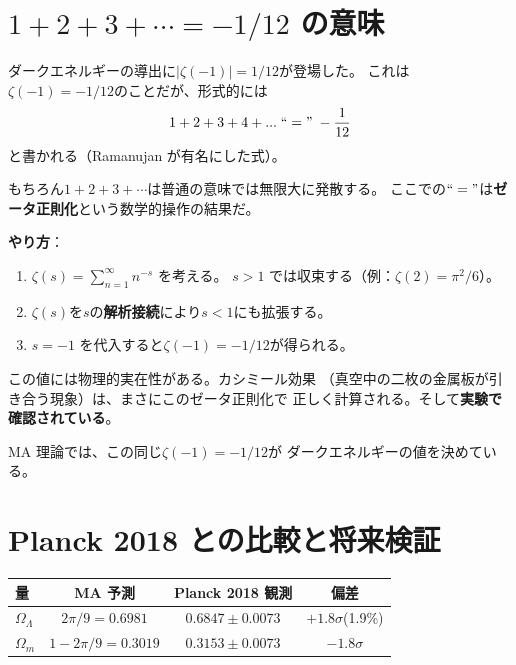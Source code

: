 \section{$1+2+3+\cdots = -1/12$ の意味}
\label{sec:zeta-regularization}

\begin{hsbox}
ダークエネルギーの導出に$|\zeta(-1)| = 1/12$が登場した。
これは$\zeta(-1) = -1/12$のことだが、形式的には
\[
1 + 2 + 3 + 4 + \cdots \;``="\; -\frac{1}{12}
\]
と書かれる（Ramanujan が有名にした式）。

もちろん$1+2+3+\cdots$は普通の意味では無限大に発散する。
ここでの$``="$は\textbf{ゼータ正則化}という数学的操作の結果だ。

\medskip
\textbf{やり方}：
\begin{enumerate}[nosep]
\item $\zeta(s) = \sum_{n=1}^{\infty} n^{-s}$ を考える。
  $s > 1$ では収束する（例：$\zeta(2) = \pi^2/6$）。
\item $\zeta(s)$を$s$の\textbf{解析接続}により$s < 1$にも拡張する。
\item $s = -1$ を代入すると$\zeta(-1) = -1/12$が得られる。
\end{enumerate}
この値には物理的実在性がある。カシミール効果
（真空中の二枚の金属板が引き合う現象）は、まさにこのゼータ正則化で
正しく計算される。そして\textbf{実験で確認されている}。

MA 理論では、この同じ$\zeta(-1) = -1/12$が
ダークエネルギーの値を決めている。
\end{hsbox}

\section{Planck 2018 との比較と将来検証}
\label{sec:DE-comparison}

\begin{center}
\begin{tabular}{lccc}
\toprule
量 & MA 予測 & Planck 2018 観測 & 偏差 \\
\midrule
$\Omega_\Lambda$ & $2\pi/9 = 0.6981$ & $0.6847 \pm 0.0073$ & $+1.8\sigma$\;(1.9\%) \\
$\Omega_m$ & $1 - 2\pi/9 = 0.3019$ & $0.3153 \pm 0.0073$ & $-1.8\sigma$ \\
\bottomrule
\end{tabular}
\end{center}

